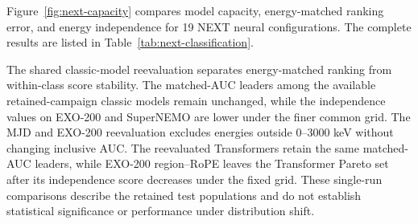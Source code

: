 Figure~\ref{fig:next-capacity} compares model capacity, energy-matched
ranking error, and energy independence for 19 NEXT neural configurations.
The complete results are listed in Table~\ref{tab:next-classification}.



The shared classic-model reevaluation separates energy-matched ranking
from within-class score stability. The matched-AUC leaders among the available
retained-campaign classic models remain unchanged, while the independence values on EXO-200 and SuperNEMO are lower
under the finer common grid. The MJD and EXO-200 reevaluation excludes energies outside 0--3000 keV
without changing inclusive AUC. The reevaluated Transformers retain the
same matched-AUC leaders, while EXO-200 region--RoPE leaves the Transformer
Pareto set after its independence score decreases under the fixed grid.
These single-run comparisons describe the retained test populations and do
not establish statistical significance or performance under distribution shift.
